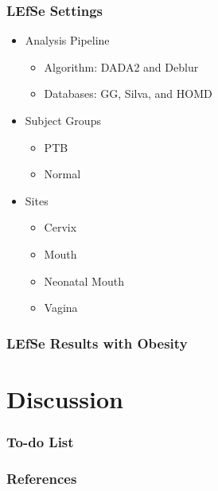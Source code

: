 \documentclass{beamer}
\begin{document}
    \begin{frame}
        \frametitle{LEfSe Settings}

        \begin{itemize}
            \item Analysis Pipeline
            \begin{itemize}
                \item Algorithm: DADA2 and Deblur
                \item Databases: GG, Silva, and HOMD
            \end{itemize}
            \item Subject Groups
            \begin{itemize}
                \item PTB
                \item Normal
            \end{itemize}
            \item Sites
            \begin{itemize}
                \item Cervix
                \item Mouth
                \item Neonatal Mouth
                \item Vagina
            \end{itemize}
        \end{itemize}
    \end{frame}

    \begin{frame}[allowframebreaks]
        \frametitle{LEfSe Results with Obesity}

    \end{frame}

    \section{Discussion}
    \begin{frame}
        \frametitle{To-do List}
    \end{frame}

   	\begin{frame}[allowframebreaks]
        \frametitle{References}
        
        
    \end{frame}
\end{document}
